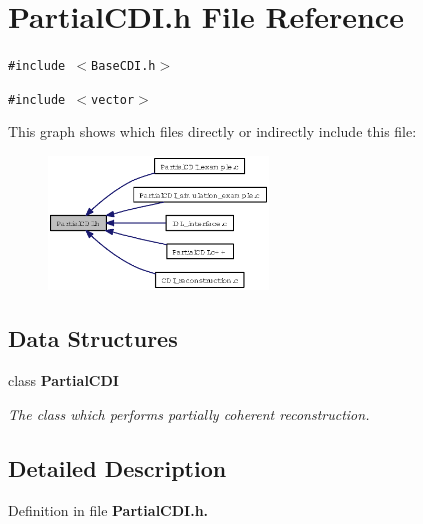 \section{Partial\-CDI.h File Reference}
\label{PartialCDI_8h}
{\tt \#include $<$Base\-CDI.h$>$}\par
{\tt \#include $<$vector$>$}\par


This graph shows which files directly or indirectly include this file:\begin{figure}[H]
\begin{center}
\leavevmode
\includegraphics[width=166pt]{PartialCDI_8h__dep__incl}
\end{center}
\end{figure}
\subsection*{Data Structures}
\begin{CompactItemize}
\item 
class \bf{Partial\-CDI}
\begin{CompactList}\small\item\em The class which performs partially coherent reconstruction. \item\end{CompactList}\end{CompactItemize}


\subsection{Detailed Description}


Definition in file \bf{Partial\-CDI.h}.